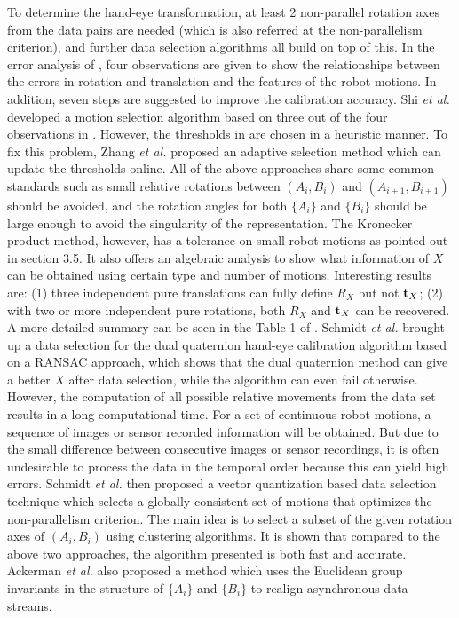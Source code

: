 \documentclass[twocolumn,10pt]{asme2ej}
\newcommand{\ttt}{{\bf t}}
\begin{document}
To determine the hand-eye transformation, at least 2 non-parallel rotation axes from the data pairs are needed (which is also referred at the non-parallelism criterion), and further data selection algorithms all build on top of this. 
In the error analysis of \cite{tsai1989new}, four observations are given to show the relationships between the errors in rotation and translation and the features of the robot motions. In addition, seven steps are suggested to improve the calibration accuracy. Shi {\it{et al.}} \cite{shi2005approach} developed a motion selection algorithm based on three out of the four observations in \cite{tsai1989new}. However, the thresholds in \cite{shi2005approach} are chosen in a heuristic manner. To fix this problem,  Zhang {\it{et al.}} \cite{zhang2005adaptive} proposed an adaptive selection method which can update the thresholds online. All of the above approaches share some common standards such as small relative rotations between $(A_i, B_i)$ and $(A_{i+1}, B_{i+1})$ should be avoided, and the rotation angles for both $\{A_i\}$ and $\{B_i\}$ should be large enough to avoid the singularity of the representation. The Kronecker product method, however, has a tolerance on small robot motions as pointed out in section 3.5. It also offers an algebraic analysis to show what information of $X$ can be obtained using certain type and number of motions. Interesting results are: (1) three independent pure translations can fully define $R_X$ but not $\ttt_{X}$; (2) with two or more independent pure rotations, both $R_{X}$ and $\ttt_{X}$ can be recovered. A more detailed summary can be seen in the Table 1 of \cite{andreff1999line}. Schmidt {\it{et al.}} \cite{schmidt2003robust} brought up a data selection for the dual quaternion hand-eye calibration algorithm based on a RANSAC approach, which shows that the dual quaternion method can give a better $X$ after data selection, while the algorithm can even fail otherwise. However, the computation of all possible relative movements from the data set results in a long computational time. For a set of continuous robot motions, a sequence of images or sensor recorded information will be obtained. But due to the small difference between consecutive images or sensor recordings, it is often undesirable to process the data in the temporal order because this can yield high errors. Schmidt {\it{et al.}} \cite{vogt2004vector} then proposed a vector quantization based data selection technique which selects a globally consistent set of motions that optimizes the non-parallelism criterion. The main idea is to select a subset of the given rotation axes of $(A_i, B_i)$ using clustering algorithms. It is shown that compared to the above two approaches, the algorithm presented is both fast and accurate. Ackerman {\it{et al.}} \cite{ackermanIROS2013} also proposed a method which uses the Euclidean group invariants in the structure of $\{A_i\}$ and $\{B_i\}$ to realign asynchronous data streams.
\end{document}
